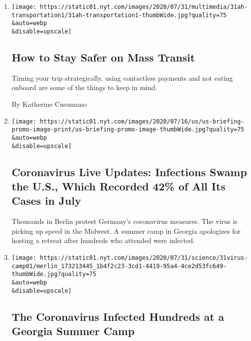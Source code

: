 \begin{enumerate}
\def\labelenumi{\arabic{enumi}.}
\item
  \href{/2020/08/01/at-home/coronavirus-public-transportation-subway.html}{}

  \texttt{[image: https://static01.nyt.com/images/2020/07/31/multimedia/31ah-transportation1/31ah-transportation1-thumbWide.jpg?quality=75\\\&auto=webp\\\&disable=upscale]}

  \hypertarget{how-to-stay-safer-on-mass-transit}{%
  \subsection{How to Stay Safer on Mass
  Transit}\label{how-to-stay-safer-on-mass-transit}}

  Timing your trip strategically, using contactless payments and not
  eating onboard are some of the things to keep in mind.

  By Katherine Cusumano
\item
  \href{/2020/08/01/world/coronavirus-covid-19.html}{}

  \texttt{[image: https://static01.nyt.com/images/2020/07/16/us/us-briefing-promo-image-print/us-briefing-promo-image-thumbWide.jpg?quality=75\\\&auto=webp\\\&disable=upscale]}

  \hypertarget{coronavirus-live-updates-infections-swamp-the-us-which-recorded-42-of-all-its-cases-in-july}{%
  \subsection{Coronavirus Live Updates: Infections Swamp the U.S., Which
  Recorded 42\% of All Its Cases in
  July}\label{coronavirus-live-updates-infections-swamp-the-us-which-recorded-42-of-all-its-cases-in-july}}

  Thousands in Berlin protest Germany's coronavirus measures. The virus
  is picking up speed in the Midwest. A summer camp in Georgia
  apologizes for hosting a retreat after hundreds who attended were
  infected.
\item
  \href{/2020/07/31/health/coronavirus-children-camp.html}{}

  \texttt{[image: https://static01.nyt.com/images/2020/07/31/science/31virus-camp01/merlin\_173213445\_1b4f2c23-3cd1-4419-95a4-4ce2d53fc649-thumbWide.jpg?quality=75\\\&auto=webp\\\&disable=upscale]}

  \hypertarget{the-coronavirus-infected-hundreds-at-a-georgia-summer-camp}{%
  \subsection{The Coronavirus Infected Hundreds at a Georgia Summer
  Camp}\label{the-coronavirus-infected-hundreds-at-a-georgia-summer-camp}}


\end{enumerate}
